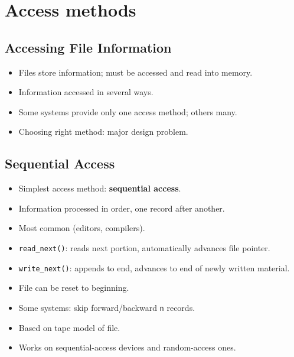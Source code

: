 \section{Access methods}

\subsection*{Accessing File Information}
\begin{itemize}
    \item Files store information; must be accessed and read into memory.
    \item Information accessed in several ways.
    \item Some systems provide only one access method; others many.
    \item Choosing right method: major design problem.
\end{itemize}

\subsection*{Sequential Access}
\begin{itemize}
    \item Simplest access method: \textbf{sequential access}.
    \item Information processed in order, one record after another.
    \item Most common (editors, compilers).
    \item \texttt{read\_next()}: reads next portion, automatically advances file pointer.
    \item \texttt{write\_next()}: appends to end, advances to end of newly written material.
    \item File can be reset to beginning.
    \item Some systems: skip forward/backward \texttt{n} records.
    \item Based on tape model of file.
    \item Works on sequential-access devices and random-access ones.
\end{itemize}

